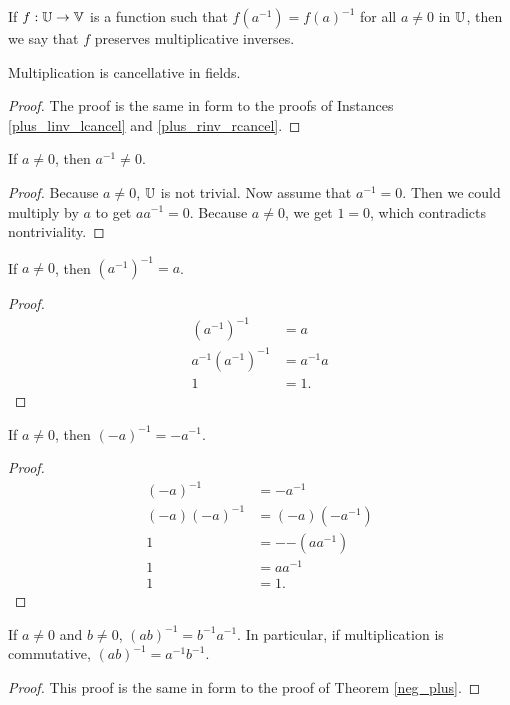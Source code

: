 \documentclass[../../math.tex]{subfiles}
\begin{document}
\begin{class}
    If $f : \mathbb{U} \to \mathbb{V}$ is a function such that $f(a^{-1}) = f(a)^{-1}$ for all
    $a \neq 0$ in $\mathbb{U}$, then we say that $f$ preserves multiplicative inverses.
\end{class}

\begin{instance}
    Multiplication is cancellative in fields.
\end{instance}
\begin{proof}
    The proof is the same in form to the proofs of Instances
    \ref{plus_linv_lcancel} and \ref{plus_rinv_rcancel}.
\end{proof}

\begin{theorem}
    If $a \neq 0$, then $a^{-1} \neq 0$.
\end{theorem}
\begin{proof}
    Because $a \neq 0$, $\mathbb{U}$ is not trivial.  Now assume that $a^{-1} = 0$.
    Then we could multiply by $a$ to get $aa^{-1} = 0$.  Because $a \neq 0$, we
    get $1 = 0$, which contradicts nontriviality.
\end{proof}

\begin{theorem}
    If $a \neq 0$, then $(a^{-1})^{-1} = a$.
\end{theorem}
\begin{proof}
    \begin{align*}
        (a^{-1})^{-1} &= a \\
        a^{-1} (a^{-1})^{-1} &= a^{-1} a \\
        1 &= 1.
    \end{align*}
\end{proof}

\begin{theorem}
    If $a \neq 0$, then $(-a)^{-1} = -a^{-1}$.
\end{theorem}
\begin{proof}
    \begin{align*}
        (-a)^{-1} &= -a^{-1} \\
        (-a)(-a)^{-1} &= (-a)(-a^{-1}) \\
        1 &= -{-(aa^{-1})} \\
        1 &= aa^{-1} \\
        1 &= 1.
    \end{align*}
\end{proof}

\begin{theorem}
    If $a \neq 0$ and $b \neq 0$, $(ab)^{-1} = b^{-1}a^{-1}$.  In particular, if
    multiplication is commutative, $(ab)^{-1} = a^{-1}b^{-1}$.
\end{theorem}
\begin{proof}
    This proof is the same in form to the proof of Theorem \ref{neg_plus}.
\end{proof}
\end{document}
